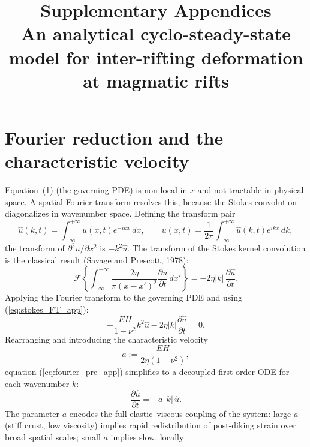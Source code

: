 \documentclass[12pt]{article}
\title{Supplementary Appendices\\
\large An analytical cyclo-steady-state model for inter-rifting deformation at magmatic rifts}
\date{}
\begin{document}
\maketitle

\appendix

\section{Fourier reduction and the characteristic velocity}
\label{app:fourier}

Equation~(1) (the governing PDE) is non-local in $x$ and not tractable in physical
space. A spatial Fourier transform resolves this, because the Stokes convolution
diagonalizes in wavenumber space. Defining the transform pair
\begin{equation*}
\hat{u}(k,t) = \int_{-\infty}^{+\infty}u(x,t)e^{-ikx}\,dx,
\qquad
u(x,t) = \frac{1}{2\pi}\int_{-\infty}^{+\infty}\hat{u}(k,t)e^{ikx}\,dk,
\end{equation*}
the transform of $\partial^2 u/\partial x^2$ is $-k^2\hat{u}$. The transform
of the Stokes kernel convolution is the classical result
(Savage and Prescott, 1978):
\begin{equation}
\mathcal{F}\!\left\{
  \int_{-\infty}^{+\infty}\frac{2\eta}{\pi(x-x')^2}
  \frac{\partial u}{\partial t}\,dx'
\right\} = -2\eta|k|\,\frac{\partial\hat{u}}{\partial t}.
\label{eq:stokes_FT_app}
\end{equation}
Applying the Fourier transform to the governing PDE and using
(\ref{eq:stokes_FT_app}):
\begin{equation}
-\frac{EH}{1-\nu^2}k^2\hat{u} - 2\eta|k|\frac{\partial\hat{u}}{\partial t} = 0.
\label{eq:fourier_pre_app}
\end{equation}
Rearranging and introducing the characteristic velocity
\begin{equation}
a := \frac{EH}{2\eta(1-\nu^2)},
\label{eq:a_app}
\end{equation}
equation (\ref{eq:fourier_pre_app}) simplifies to a decoupled first-order ODE for
each wavenumber $k$:
\begin{equation}
\frac{\partial\hat{u}}{\partial t} = -a\,|k|\,\hat{u}.
\label{eq:fourier_app}
\end{equation}
The parameter $a$ encodes the full elastic--viscous coupling of the system:
large $a$ (stiff crust, low viscosity) implies rapid redistribution of
post-diking strain over broad spatial scales; small $a$ implies slow, locally
\end{document}
